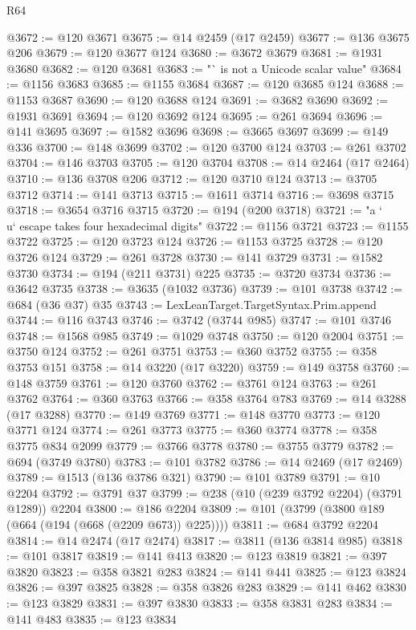 \begin{lexlean}{R64}
\begin{coremodule}
@3672 := @120 @3671
@3675 := @14 @2459 (@17 @2459)
@3677 := @136 @3675 @206
@3679 := @120 @3677 @124
@3680 := @3672 @3679
@3681 := @1931 @3680
@3682 := @120 @3681
@3683 := "` is not a Unicode scalar value"
@3684 := @1156 @3683
@3685 := @1155 @3684
@3687 := @120 @3685 @124
@3688 := @1153 @3687
@3690 := @120 @3688 @124
@3691 := @3682 @3690
@3692 := @1931 @3691
@3694 := @120 @3692 @124
@3695 := @261 @3694
@3696 := @141 @3695
@3697 := @1582 @3696
@3698 := @3665 @3697
@3699 := @149 @336
@3700 := @148 @3699
@3702 := @120 @3700 @124
@3703 := @261 @3702
@3704 := @146 @3703
@3705 := @120 @3704
@3708 := @14 @2464 (@17 @2464)
@3710 := @136 @3708 @206
@3712 := @120 @3710 @124
@3713 := @3705 @3712
@3714 := @141 @3713
@3715 := @1611 @3714
@3716 := @3698 @3715
@3718 := @3654 @3716 @3715
@3720 := @194 (@200 @3718)
@3721 := "a `\\u` escape takes four hexadecimal digits"
@3722 := @1156 @3721
@3723 := @1155 @3722
@3725 := @120 @3723 @124
@3726 := @1153 @3725
@3728 := @120 @3726 @124
@3729 := @261 @3728
@3730 := @141 @3729
@3731 := @1582 @3730
@3734 := @194 (@211 @3731) @225
@3735 := @3720 @3734
@3736 := @3642 @3735
@3738 := @3635 (@1032 @3736)
@3739 := @101 @3738
@3742 := @684 (@36 @37) @35
@3743 := LexLeanTarget.TargetSyntax.Prim.append
@3744 := @116 @3743
@3746 := @3742 (@3744 @985)
@3747 := @101 @3746
@3748 := @1568 @985
@3749 := @1029 @3748
@3750 := @120 @2004
@3751 := @3750 @124
@3752 := @261 @3751
@3753 := @360 @3752
@3755 := @358 @3753 @151
@3758 := @14 @3220 (@17 @3220)
@3759 := @149 @3758
@3760 := @148 @3759
@3761 := @120 @3760
@3762 := @3761 @124
@3763 := @261 @3762
@3764 := @360 @3763
@3766 := @358 @3764 @783
@3769 := @14 @3288 (@17 @3288)
@3770 := @149 @3769
@3771 := @148 @3770
@3773 := @120 @3771 @124
@3774 := @261 @3773
@3775 := @360 @3774
@3778 := @358 @3775 @834 @2099
@3779 := @3766 @3778
@3780 := @3755 @3779
@3782 := @694 (@3749 @3780)
@3783 := @101 @3782
@3786 := @14 @2469 (@17 @2469)
@3789 := @1513 (@136 @3786 @321)
@3790 := @101 @3789
@3791 := @10 @2204
@3792 := @3791 @37
@3799 := @238 (@10 (@239 @3792 @2204) (@3791 @1289)) @2204
@3800 := @186 @2204
@3809 := @101 (@3799 (@3800 @189 (@664 (@194 (@668 (@2209 @673)) @225))))
@3811 := @684 @3792 @2204
@3814 := @14 @2474 (@17 @2474)
@3817 := @3811 (@136 @3814 @985)
@3818 := @101 @3817
@3819 := @141 @413
@3820 := @123 @3819
@3821 := @397 @3820
@3823 := @358 @3821 @283
@3824 := @141 @441
@3825 := @123 @3824
@3826 := @397 @3825
@3828 := @358 @3826 @283
@3829 := @141 @462
@3830 := @123 @3829
@3831 := @397 @3830
@3833 := @358 @3831 @283
@3834 := @141 @483
@3835 := @123 @3834

\end{coremodule}
\end{lexlean}
